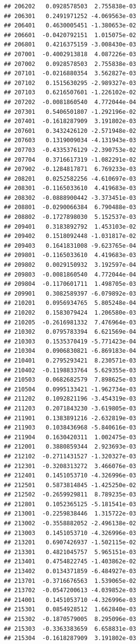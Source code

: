 \documentclass[ignorenonframetext,]{beamer}
\begin{document}
\begin{frame}[fragile]
\begin{verbatim}
## 206202   0.0928578503  2.755838e-03
## 206301   0.2491971252 -4.069563e-03
## 206401   0.4630005451 -1.380653e-02
## 206601  -0.0420792151  1.015075e-02
## 206801   0.4216375159 -3.008430e-03
## 207001  -0.4002913818  4.087226e-03
## 207002   0.0928578503  2.755838e-03
## 207101  -0.0216880354  3.562827e-03
## 207102   0.1515630295 -2.989327e-03
## 207103   0.6216507601 -1.226102e-02
## 207202  -0.0081860540  4.772044e-04
## 207301   0.5406501807 -1.292196e-02
## 207401  -0.1618287909  3.191802e-03
## 207601   0.3432426120 -2.571948e-02
## 207603   0.1319009034 -4.131943e-03
## 207703  -0.4335376129 -2.390753e-02
## 207704   0.3716617319 -1.082291e-02
## 207902  -0.1284817871  6.769233e-03
## 208201   0.0252582256 -4.610697e-03
## 208301  -0.1165033610  4.419683e-03
## 208302  -0.0888900442 -3.373451e-03
## 208801  -0.0290066384  6.790488e-03
## 208802  -0.1727898030  5.152537e-03
## 209401   0.3183892792  1.453103e-02
## 209402   0.1518092448 -1.031817e-02
## 209403   0.1641831008 -9.623765e-04
## 209801  -0.1165033610  4.419683e-03
## 209802   0.0029150932  3.192597e-04
## 209803  -0.0081860540  4.772044e-04
## 209804  -0.1170601711  1.498705e-03
## 209901   0.3082589397 -6.079892e-03
## 210201   0.0956934765  5.805248e-04
## 210202   0.1583079424  1.206580e-03
## 210205  -0.2616981332  7.476964e-03
## 210302   0.0795783394  6.621569e-04
## 210303   0.1535370419 -5.771423e-04
## 210304   0.0906830821 -6.869183e-04
## 210401   0.2795293421  8.230571e-03
## 210402  -0.1198833764  5.629355e-03
## 210503   0.0682682579  7.898625e-03
## 210504   0.0995133421 -1.962734e-03
## 211202   0.1092821196 -3.454319e-03
## 211203   0.2071843230 -3.619805e-03
## 211901   0.1383891216 -2.632819e-03
## 211903   0.1038436968 -5.840616e-03
## 211904   0.1630420311  1.002475e-03
## 212001   0.3880859344  2.923693e-03
## 212102  -0.2711431527 -1.320327e-03
## 212301  -0.3208313272  3.466076e-03
## 212401   0.1451053710 -4.326996e-03
## 212501   0.5873814845 -1.425250e-02
## 212502  -0.2659929811  8.789235e-03
## 212801   0.1052365125 -5.181541e-03
## 213001  -0.2259838446  1.315722e-03
## 213002  -0.3558882052 -2.496138e-02
## 213003   0.1451053710 -4.326996e-03
## 213201   0.6907426937 -1.502115e-02
## 213301   0.4821045757  5.965151e-03
## 213401   0.4754822745 -1.403862e-02
## 213402   0.0134371859 -6.484927e-03
## 213701  -0.3716676563  1.539065e-02
## 213702  -0.0547200613 -4.039852e-03
## 214001   0.1451053710 -4.326996e-03
## 215301   0.0854928512  1.662840e-03
## 215302  -0.1870579005  8.295096e-03
## 215303  -0.3363383659  6.658831e-03
## 215304  -0.1618287909  3.191802e-03

\end{verbatim}
\end{frame}
\end{document}

